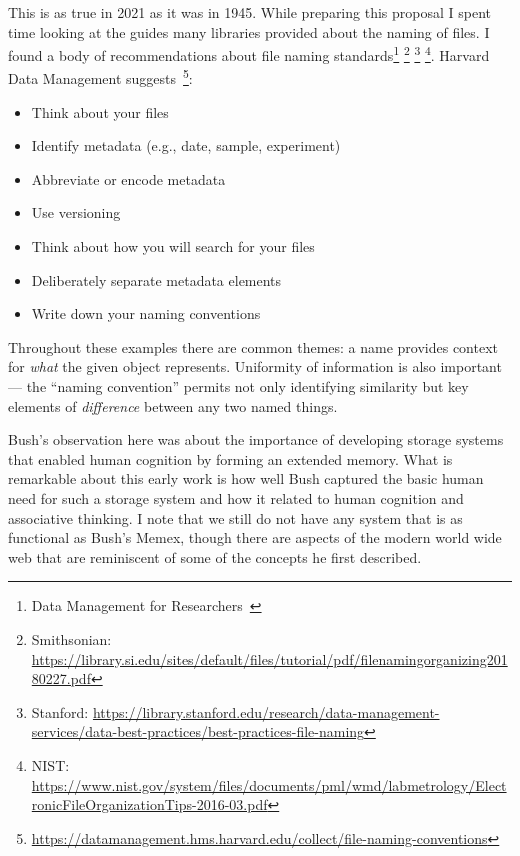 This is as true in 2021 as it was in 1945.  While preparing this proposal I
spent time looking at the guides many libraries provided about the naming of
files. I found a body of recommendations about file naming
standards\footnote{Data Management for
    Researchers~\cite{briney2015data}}
\footnote{Smithsonian: \url{https://library.si.edu/sites/default/files/tutorial/pdf/filenamingorganizing20180227.pdf}}
\footnote{Stanford: \url{https://library.stanford.edu/research/data-management-services/data-best-practices/best-practices-file-naming}}
\footnote{NIST: \url{https://www.nist.gov/system/files/documents/pml/wmd/labmetrology/ElectronicFileOrganizationTips-2016-03.pdf}}.
Harvard Data Management suggests~\footnote{\url{https://datamanagement.hms.harvard.edu/collect/file-naming-conventions}}:

\begin{itemize}
    \item Think about your files
    \item Identify metadata (e.g., date, sample, experiment)
    \item Abbreviate or encode metadata
    \item Use versioning
    \item Think about how you will search for your files
    \item Deliberately separate metadata elements
    \item Write down your naming conventions
\end{itemize}


Throughout these examples there are common themes: a name provides context for
\emph{what} the given object represents. Uniformity of information is also
important --- the ``naming convention'' permits not only identifying similarity
but key elements of \emph{difference} between any two named things.





Bush's observation here was about
the importance of developing storage systems that enabled human cognition by
forming an extended memory.  What is remarkable about this early work is how
well Bush captured the basic human need for such a storage system and how it
related to human cognition and associative thinking.  I note that we still do
not have any system that is as functional as Bush's Memex, though there are
aspects of the modern world wide web that are reminiscent of some of the
concepts he first described.

